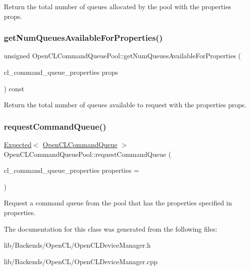 Return the total number of queues allocated by the pool with the properties {\ttfamily props}. \mbox{\label{classglow_1_1runtime_1_1_open_c_l_command_queue_pool_a58fe81267fed85fdf99ef443faf9a286}} 
\subsubsection{\texorpdfstring{get\+Num\+Queues\+Available\+For\+Properties()}{getNumQueuesAvailableForProperties()}}
{\footnotesize\ttfamily unsigned Open\+C\+L\+Command\+Queue\+Pool\+::get\+Num\+Queues\+Available\+For\+Properties (\begin{DoxyParamCaption}\item[{cl\+\_\+command\+\_\+queue\+\_\+properties}]{props }\end{DoxyParamCaption}) const}

Return the total number of queues available to request with the properties {\ttfamily props}. \mbox{\label{classglow_1_1runtime_1_1_open_c_l_command_queue_pool_a2486ee8c7684f5a6fc420fbb19c3166f}} 
\subsubsection{\texorpdfstring{request\+Command\+Queue()}{requestCommandQueue()}}
{\footnotesize\ttfamily \hyperlink{classglow_1_1detail_1_1_glow_expected}{Expected}$<$ \hyperlink{structglow_1_1runtime_1_1_open_c_l_command_queue}{Open\+C\+L\+Command\+Queue} $>$ Open\+C\+L\+Command\+Queue\+Pool\+::request\+Command\+Queue (\begin{DoxyParamCaption}\item[{cl\+\_\+command\+\_\+queue\+\_\+properties}]{properties = {} }\end{DoxyParamCaption})}

Request a command queue from the pool that has the properties specified in {\ttfamily properties}. 

The documentation for this class was generated from the following files\+:\begin{DoxyCompactItemize}
\item 
lib/\+Backends/\+Open\+C\+L/Open\+C\+L\+Device\+Manager.\+h\item 
lib/\+Backends/\+Open\+C\+L/Open\+C\+L\+Device\+Manager.\+cpp\end{DoxyCompactItemize}
